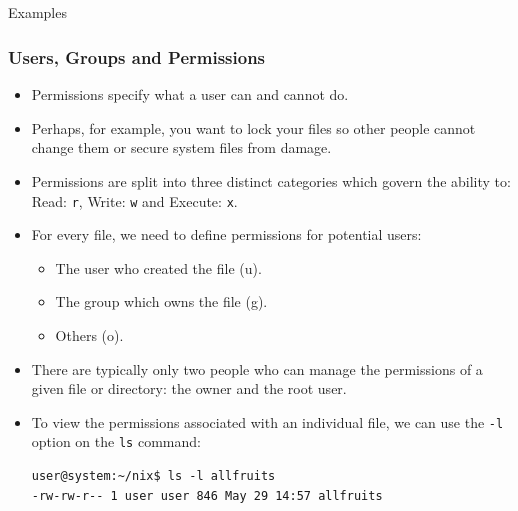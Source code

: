 \documentclass[10pt]{beamer}
\begin{document}
\subsection{}
\begin{frame}[fragile]{Examples}
\frametitle{Users, Groups and Permissions}
\begin{itemize}
\item Permissions  specify what a user can and cannot do.\vspace{0.05in}
\item  Perhaps, for example, you want to lock your files so other people cannot change them or secure system files from damage. \vspace{0.05in}
\item Permissions are split into three distinct categories which govern the ability to: Read: \texttt{r}, Write: \texttt{w} and Execute: \texttt{x}.\vspace{0.05in}
\item For every file, we need to define permissions for potential users: 
\begin{itemize}
\item The user who created the file (u).
\item The group which owns the file (g).
\item Others (o).\vspace{0.05in}
\end{itemize}
\item There are typically only two people who can manage the permissions of a given file or directory: the owner and the root user. \vspace{0.05in}
\item To view the permissions associated with an individual file, we can use the \texttt{-l} option on the \texttt{ls} command:\\
\begin{lstlisting}[style=BashInputStyle]
user@system:~/nix$ ls -l allfruits
-rw-rw-r-- 1 user user 846 May 29 14:57 allfruits
\end{lstlisting}
\end{itemize}
\end{frame}
\end{document}
